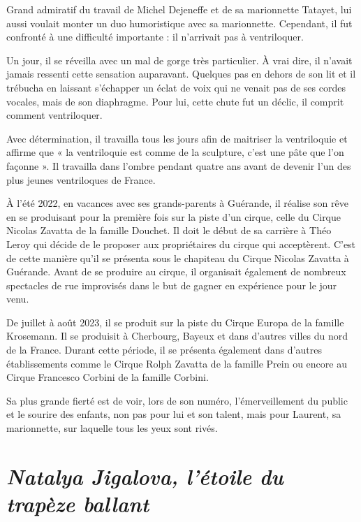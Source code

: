 Grand admiratif du travail de Michel Dejeneffe et de sa marionnette Tatayet, lui aussi voulait monter un duo humoristique avec sa marionnette. Cependant, il fut confronté à une difficulté importante : il n’arrivait pas à ventriloquer.

Un jour, il se réveilla avec un mal de gorge très particulier. À vrai dire, il n’avait jamais ressenti cette sensation auparavant. Quelques pas en dehors de son lit et il trébucha en laissant s’échapper un éclat de voix qui ne venait pas de ses cordes vocales, mais de son diaphragme. Pour lui, cette chute fut un déclic, il comprit comment ventriloquer.

Avec détermination, il travailla tous les jours afin de maitriser la ventriloquie et affirme que « la ventriloquie est comme de la sculpture, c’est une pâte que l’on façonne ». Il travailla dans l’ombre pendant quatre ans avant de devenir l’un des plus jeunes ventriloques de France.

À l’été 2022, en vacances avec ses grands-parents à Guérande, il réalise son rêve en se produisant pour la première fois sur la piste d’un cirque, celle du Cirque Nicolas Zavatta de la famille Douchet. Il doit le début de sa carrière à Théo Leroy qui décide de le proposer aux propriétaires du cirque qui acceptèrent. C’est de cette manière qu’il se présenta sous le chapiteau du Cirque Nicolas Zavatta à Guérande. Avant de se produire au cirque, il organisait également de nombreux spectacles de rue improvisés dans le but de gagner en expérience pour le jour venu.

De juillet à août 2023, il se produit sur la piste du Cirque Europa de la famille Krosemann. Il se produisit à Cherbourg, Bayeux et dans d’autres villes du nord de la France. Durant cette période, il se présenta également dans d’autres établissements comme le Cirque Rolph Zavatta de la famille Prein ou encore au Cirque Francesco Corbini de la famille Corbini.

Sa plus grande fierté est de voir, lors de son numéro, l’émerveillement du public et le sourire des enfants, non pas pour lui et son talent, mais pour Laurent, sa marionnette, sur laquelle tous les yeux sont rivés.

\section*{\textit{Natalya Jigalova, l’étoile du trapèze ballant }}
{}

